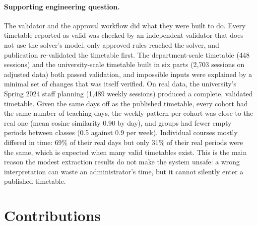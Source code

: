 \paragraph{Supporting engineering question.} The validator and the approval workflow did what they were built to do. Every timetable reported as valid was checked by an independent validator that does not use the solver's model, only approved rules reached the solver, and publication re-validated the timetable first. The department-scale timetable (448 sessions) and the university-scale timetable built in six parts (2{,}703 sessions on adjusted data) both passed validation, and impossible inputs were explained by a minimal set of changes that was itself verified. On real data, the university's Spring 2024 staff planning (1{,}489 weekly sessions) produced a complete, validated timetable. Given the same days off as the published timetable, every cohort had the same number of teaching days, the weekly pattern per cohort was close to the real one (mean cosine similarity 0.90 by day), and groups had fewer empty periods between classes (0.5 against 0.9 per week). Individual courses mostly differed in time: 69\% of their real days but only 31\% of their real periods were the same, which is expected when many valid timetables exist. This is the main reason the modest extraction results do not make the system unsafe: a wrong interpretation can waste an administrator's time, but it cannot silently enter a published timetable.

\section{Contributions}

